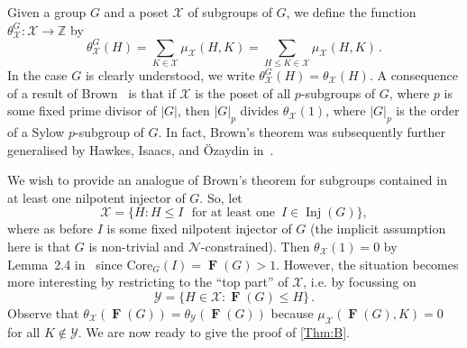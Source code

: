 \documentclass[a4paper,12pt,reqno]{amsart}
\numberwithin{equation}{section}
\DeclareMathOperator{\fitt}{\mathbf{F}}
\DeclareMathOperator{\inj}{Inj}
\newcommand{\card}[1]{\left\lvert{#1}\right\rvert}
\renewcommand{\leq}{\leqslant}
\begin{document}
Given a group $G$ and a poset $\mathcal{X}$ of subgroups of $G$,
we define the function $\theta_{\mathcal{X}}^G : \mathcal{X} \rightarrow \mathbb{Z}$ by
\[
\theta_{\mathcal{X}}^G(H) = \sum_{K \in \mathcal{X}} \mu_{\mathcal{X}}(H, K) 
                        = \sum_{H \leq K \in \mathcal{X}} \mu_{\mathcal{X}}(H, K)\,.
\]
In the case $G$ is clearly understood, we write $\theta_{\mathcal{X}}^G(H) = \theta_{\mathcal{X}}(H) $. 
A consequence of a result of Brown~\cite{pfractional} is that 
if $\mathcal{X}$ is the poset of all $p$-subgroups of $G$,
where $p$ is some fixed prime divisor of $\card{G}$,
then $\card{G}_p$ divides $\theta_{\mathcal{X}}(1)$,
where $\card{G}_p$ is the order of a Sylow $p$-subgroup of $G$.
In fact, Brown's theorem was subsequently further generalised by Hawkes, Isaacs, and \"Ozaydin in~\cite[Thm.~5.1]{mobius}.

We wish to provide an analogue of Brown's theorem 
for subgroups contained in at least one nilpotent injector of $G$.
So, let 
\[
\mathcal{X} = \{H: H \leq I\,\, \mbox{ for at least one }\, I \in \inj(G)\},
\]
where as before $I$ is some fixed nilpotent injector of $G$
(the implicit assumption here is that $G$ is non-trivial and $\mathcal{N}$-constrained).
Then $\theta_{\mathcal{X}}(1) = 0$ by Lemma~2.4 in~\cite{mobius} 
since $\mathrm{Core}_G(I) = \fitt(G) > 1$.
However, the situation becomes more interesting 
by restricting to the \enquote{top part} of $\mathcal{X}$, 
i.e. by focussing on
\[
\mathcal{Y}= \{H \in \mathcal{X} : \fitt(G) \leq H\}\,. 
\]
Observe that $\theta_{\mathcal{X}}(\fitt(G))= \theta_{\mathcal{Y}}(\fitt(G))$ because 
$\mu_{\mathcal{X}}(\fitt(G), K) = 0 $ for all $K \notin \mathcal{Y}$. 
We are now ready to give the proof of  \autoref{Thm:B}. 
\end{document}
